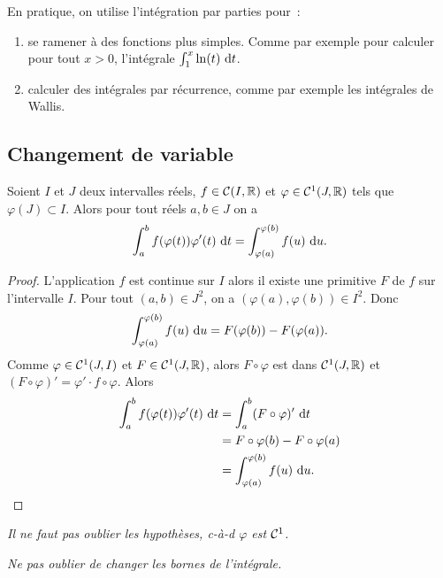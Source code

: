 En pratique, on utilise l'intégration par parties pour~:
\begin{enumerate}
\item se ramener à des fonctions plus simples. Comme par exemple pour calculer pour tout \(x>0\), l'intégrale \(\int_1^x \ln(t)\,\mathop{}\mathopen{}\mathrm{d} t\).
\item calculer des intégrales par récurrence, comme par exemple les intégrales de Wallis.
\end{enumerate}

\subsection{Changement de variable}

\begin{theo}
  Soient \(I\) et \(J\) deux intervalles réels, \(f \in \mathcal{C}(I,\mathbb{R})\) et \(\varphi \in \mathcal{C}^{1}(J,\mathbb{R})\) tels que \(\varphi(J) \subset I\). Alors pour tout réels \(a, b \in J\) on a
  \begin{equation}
    \int_a^b f(\varphi(t)) \varphi'(t)\,\mathop{}\mathopen{}\mathrm{d} t = \int_{\varphi(a)}^{\varphi(b)} f(u)\,\mathop{}\mathopen{}\mathrm{d} u.
  \end{equation}
\end{theo}
\begin{proof}
  L'application \(f\) est continue sur \(I\) alors il existe une primitive \(F\) de \(f\) sur l'intervalle \(I\). Pour tout \((a,b) \in J^2\), on a \((\varphi(a), \varphi(b)) \in I^2\). Donc
  \begin{equation}
    \int_{\varphi(a)}^{\varphi(b)}f(u)\,\mathop{}\mathopen{}\mathrm{d} u = F(\varphi(b)) - F(\varphi(a)).
  \end{equation}
  Comme \(\varphi \in \mathcal{C}^{1}(J,I)\) et \(F \in \mathcal{C}^{1}(J,\mathbb{R})\), alors \(F \circ \varphi\) est dans  \(\mathcal{C}^{1}(J,\mathbb{R})\) et \((F\circ \varphi)'=\varphi' \cdot f \circ \varphi\). Alors
  \begin{align}
    \int_a^b f(\varphi(t)) \varphi'(t)\,\mathop{}\mathopen{}\mathrm{d} t &= \int_a^b (F\circ \varphi)'\,\mathop{}\mathopen{}\mathrm{d} t\\
    &=F\circ \varphi(b) - F\circ \varphi(a) \\
    &=\int_{\varphi(a)}^{\varphi(b)}f(u)\,\mathop{}\mathopen{}\mathrm{d} u.
  \end{align}
\end{proof}

\danger \emph{Il ne faut pas oublier les hypothèses, c-à-d \(\varphi\) est \(\mathcal{C}^{1}\).}

\danger \emph{Ne pas oublier de changer les bornes de l'intégrale.}

